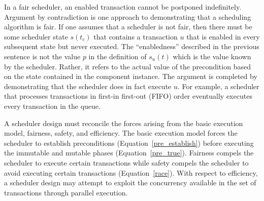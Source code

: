 
In a fair scheduler, an enabled transaction cannot be postponed indefinitely.
Argument by contradiction is one approach to demonstrating that a scheduling algorithm is fair.
If one assumes that a scheduler is not fair, then there must be some scheduler state $s(t_c)$ that contains a transaction $u$ that is enabled in every subsequent state but never executed.
The ``enabledness'' described in the previous sentence is not the value $p$ in the definition of $s_u(t)$ which is the value known by the scheduler.
Rather, it refers to the actual value of the precondition based on the state contained in the component instance.
The argument is completed by demonstrating that the scheduler does in fact execute $u$.
For example, a scheduler that processes transactions in first-in first-out (FIFO) order eventually executes every transaction in the queue.

A scheduler design must reconcile the forces arising from the basic execution model, fairness, safety, and efficiency.
The basic execution model forces the scheduler to establish preconditions (Equation~\ref{pre_establish}) before executing the immutable and mutable phases (Equation~\ref{pre_true}).
Fairness compels the scheduler to execute certain transactions while safety compels the scheduler to avoid executing certain transactions (Equation~\ref{race}).
With respect to efficiency, a scheduler design may attempt to exploit the concurrency available in the set of transactions through parallel execution.

